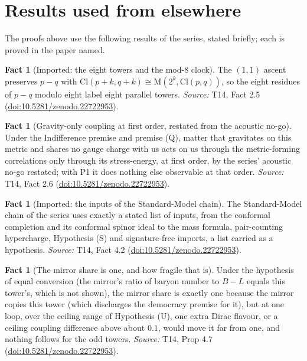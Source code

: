 \documentclass[11pt]{article}
\theoremstyle{definition}
\newtheorem{fact}[theorem]{Fact}
\theoremstyle{plain}
\providecommand{\Cl}{}\renewcommand{\Cl}{\mathrm{Cl}}
\providecommand{\Mat}{}\renewcommand{\Mat}{\mathrm{M}}
\begin{document}
\section{Results used from elsewhere}
The proofs above use the following results of the series, stated briefly; each is proved in the paper named.

\begin{fact}[Imported: the eight towers and the mod-8 clock]\label{c:dark-matter.imported-eight-towers-mod-8-clock}
The $(1,1)$ ascent preserves $p - q$ with $\Cl(p+k,q+k) \cong \Mat(2^{k}, \Cl(p,q))$, so the eight residues of $p - q$ modulo eight label eight parallel towers.
\emph{Source:} T14, Fact 2.5 (\href{https://doi.org/10.5281/zenodo.22722953}{doi:10.5281/zenodo.22722953}).
\end{fact}

\begin{fact}[Gravity-only coupling at first order, restated from the acoustic no-go]\label{c:dark-matter.imported-gravity-only-coupling}
Under the Indifference premise and premise (Q), matter that gravitates on this metric and shares no gauge charge with us acts on us through the metric-forming correlations only through its stress-energy, at first order, by the series' acoustic no-go restated; with P1 it does nothing else observable at that order.
\emph{Source:} T14, Fact 2.6 (\href{https://doi.org/10.5281/zenodo.22722953}{doi:10.5281/zenodo.22722953}).
\end{fact}

\begin{fact}[Imported: the inputs of the Standard-Model chain]\label{c:dark-matter.imported-inputs-standard-model-chain}
The Standard-Model chain of the series uses exactly a stated list of inputs, from the conformal completion and its conformal spinor ideal to the mass formula, pair-counting hypercharge, Hypothesis (S) and signature-free imports, a list carried as a hypothesis.
\emph{Source:} T14, Fact 4.2 (\href{https://doi.org/10.5281/zenodo.22722953}{doi:10.5281/zenodo.22722953}).
\end{fact}

\begin{fact}[The mirror share is one, and how fragile that is]\label{c:dark-matter.mirror-share-one-how-fragile}
Under the hypothesis of equal conversion (the mirror's ratio of baryon number to $B - L$ equals this tower's, which is not shown), the mirror share is exactly one because the mirror copies this tower (which discharges the democracy premise for it), but at one loop, over the ceiling range of Hypothesis (U), one extra Dirac flavour, or a ceiling coupling difference above about $0.1$, would move it far from one, and nothing follows for the odd towers.
\emph{Source:} T14, Prop 4.7 (\href{https://doi.org/10.5281/zenodo.22722953}{doi:10.5281/zenodo.22722953}).
\end{fact}
\end{document}

